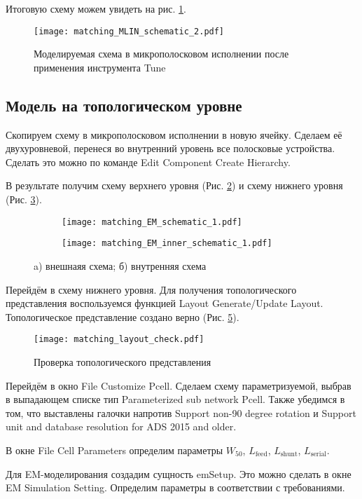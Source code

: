 Итоговую схему можем увидеть на рис. \ref{fig:matching_MLIN_schematic_2}.

\begin{figure}
    \centering
    \texttt{[image: matching\_MLIN\_schematic\_2.pdf]}
    \caption{Моделируемая схема в микрополосковом исполнении после применения инструмента Tune}
    \label{fig:matching_MLIN_schematic_2}
\end{figure}

\subsection{Модель на топологическом уровне}

Скопируем схему в микрополосковом исполнении в новую ячейку. Сделаем её двухуровневой, перенеся во внутренний уровень все полосковые устройства. Сделать это можно по команде Edit \textrightarrow Component \textrightarrow Create Hierarchy.

В результате получим схему верхнего уровня (Рис. \ref{fig:matching_EM_schematic}) и схему нижнего уровня (Рис. \ref{fig:matching_EM_inner_schematic}).

\begin{figure}[!ht]
    \begin{subfigure}[b]{0.6\textwidth}
        \centering
        \texttt{[image: matching\_EM\_schematic\_1.pdf]}
        \caption{}
        \label{fig:matching_EM_schematic}
    \end{subfigure}
    \hfill
    \begin{subfigure}[b]{0.3\textwidth}
        \centering
        \texttt{[image: matching\_EM\_inner\_schematic\_1.pdf]}
        \caption{}
        \label{fig:matching_EM_inner_schematic}
    \end{subfigure}
    \caption{
        a) внешнаяя схема;
        б) внутренняя схема
    }
    \label{fig:matching_EM_schematics}
\end{figure}

Перейдём в схему нижнего уровня. Для получения топологического представления воспользуемся функцией Layout \textrightarrow Generate/Update Layout.
Топологическое представление создано верно (Рис. \ref{fig:matching_layout_check}).

\begin{figure}[!ht]
    \centering
    \texttt{[image: matching\_layout\_check.pdf]}
    \caption{Проверка топологического представления}
    \label{fig:matching_layout_check}
\end{figure}

Перейдём в окно File \textrightarrow Customize Pcell.
Сделаем схему параметризуемой, выбрав в выпадающем списке тип Parameterized sub network Pcell.
Также убедимся в том, что выставлены галочки напротив Support non-90 degree rotation и Support unit and database resolution for ADS 2015 and older.

В окне File \textrightarrow Cell Parameters определим параметры $W_{50}$, $L_\text{feed}$, $L_\text{shunt}$, $L_\text{serial}$.

Для EM-моделирования создадим сущность emSetup.
Это можно сделать в окне EM \textrightarrow Simulation Setting.
Определим параметры в соответствии с требованиями.
